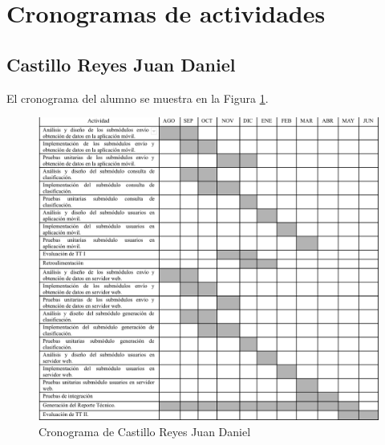 \section{Cronogramas de actividades}
\subsection{Castillo Reyes Juan Daniel}
El cronograma del alumno se muestra en la Figura \ref{fig:cronograma_batiz}.
\begin{figure}[H]
	\centering
	\includegraphics[width=1\textwidth]{Apendice1/cronogramas/batiz}
	\caption{Cronograma de Castillo Reyes Juan Daniel}
	\label{fig:cronograma_batiz}
\end{figure}
